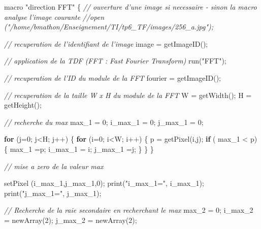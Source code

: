 \documentclass[french,]{article}
\newenvironment{Shaded}{}{}
\newcommand{\KeywordTok}[1]{\textcolor[rgb]{0.00,0.44,0.13}{\textbf{{#1}}}}
\newcommand{\DecValTok}[1]{\textcolor[rgb]{0.25,0.63,0.44}{{#1}}}
\newcommand{\StringTok}[1]{\textcolor[rgb]{0.25,0.44,0.63}{{#1}}}
\newcommand{\CommentTok}[1]{\textcolor[rgb]{0.38,0.63,0.69}{\textit{{#1}}}}
\newcommand{\FunctionTok}[1]{\textcolor[rgb]{0.02,0.16,0.49}{{#1}}}
\newcommand{\NormalTok}[1]{{#1}}
\begin{document}
\begin{Shaded}
\begin{Highlighting}[]
\NormalTok{macro }\StringTok{"direction FFT"}
\NormalTok{\{}
    \CommentTok{// ouverture d'une image si necessaire - sinon la macro analyse l'image courante}
    \CommentTok{//open ("/home/bmathon/Enseignement/TI/tp6_TF/images/256_a.jpg");}

    \CommentTok{// recuperation de l'identifiant de l'image}
    \NormalTok{image = }\FunctionTok{getImageID}\NormalTok{();}

    \CommentTok{// application de la TDF (FFT : Fast Fourier Transform)}
    \FunctionTok{run}\NormalTok{(}\StringTok{"FFT"}\NormalTok{);}

    \CommentTok{// recuperation de l'ID du module de la FFT}
    \NormalTok{fourier = }\FunctionTok{getImageID}\NormalTok{();}

    \CommentTok{// recuperation de la taille W x H du module de la FFT}
    \NormalTok{W = }\FunctionTok{getWidth}\NormalTok{();}
    \NormalTok{H = }\FunctionTok{getHeight}\NormalTok{();}

    \CommentTok{// recherche du max}
    \NormalTok{max_1 = }\DecValTok{0}\NormalTok{; }
    \NormalTok{i_max_1 = }\DecValTok{0}\NormalTok{;}
    \NormalTok{j_max_1 = }\DecValTok{0}\NormalTok{;}
    
    \KeywordTok{for} \NormalTok{(j=}\DecValTok{0}\NormalTok{; j<H; j++)}
    \NormalTok{\{}
        \KeywordTok{for} \NormalTok{(i=}\DecValTok{0}\NormalTok{; i<W; i++) }
        \NormalTok{\{}
            \NormalTok{p = }\FunctionTok{getPixel}\NormalTok{(i,j);}
            \KeywordTok{if} \NormalTok{( max_1 < p)}
            \NormalTok{\{}
                \NormalTok{max_1 =p;}
                \NormalTok{i_max_1 = i;}
                \NormalTok{j_max_1 =j;}
            \NormalTok{\} }
        \NormalTok{\}}
    \NormalTok{\}}

    \CommentTok{// mise a zero de la valeur max}

        \FunctionTok{setPixel} \NormalTok{(i_max_1,j_max_1,}\DecValTok{0}\NormalTok{);}
    \FunctionTok{print}\NormalTok{(}\StringTok{"i_max_1="}\NormalTok{, i_max_1);}
    \FunctionTok{print}\NormalTok{(}\StringTok{"j_max_1="}\NormalTok{, j_max_1);}


    \CommentTok{// Recherche de la raie secondaire en recherchant le max}
    \NormalTok{max_2 = }\DecValTok{0}\NormalTok{;}
    \NormalTok{i_max_2 = }\FunctionTok{newArray}\NormalTok{(}\DecValTok{2}\NormalTok{);}
    \NormalTok{j_max_2 = }\FunctionTok{newArray}\NormalTok{(}\DecValTok{2}\NormalTok{);}


\end{Highlighting}
\end{Shaded}
\end{document}
